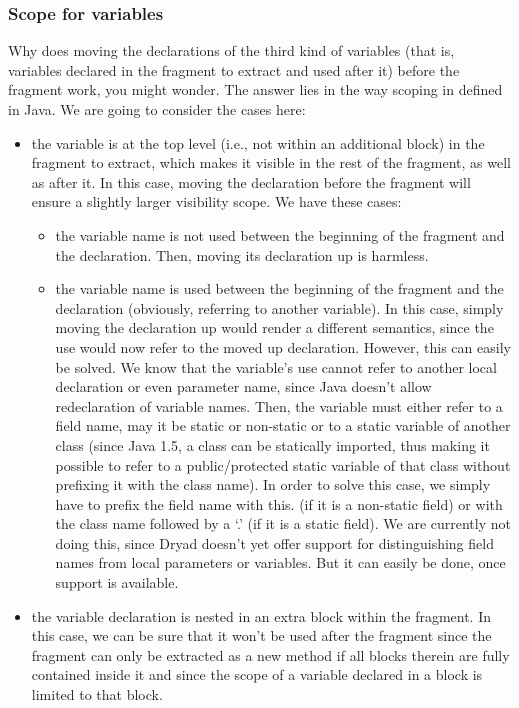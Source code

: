 \documentclass[a4paper,10pt]{article}
\begin{document}
\subsubsection*{Scope for variables}

Why does moving the declarations of the third kind of variables
(that is, variables declared in the fragment to extract and used after it)
before the fragment work, you might wonder. The answer lies in the
way scoping in defined in Java. We are going to consider the cases here:

\begin{itemize}

\item the variable is at the top level (i.e., not within an additional
block) in the fragment to extract, which makes it visible in the
rest of the fragment, as well as after it. In this case, moving the
declaration before the fragment will ensure a slightly larger
visibility scope. We have these cases:

\begin{itemize}

\item the variable name is not used between the beginning of the
fragment and the declaration. Then, moving its declaration up
is harmless.

\item the variable name is used between the beginning of the
fragment and the declaration (obviously, referring to another
variable). In this case, simply moving the declaration up would
render a different semantics, since the use would now refer to
the moved up declaration. However, this can easily be solved.
We know that the variable's use cannot refer to another local
declaration or even parameter name, since Java doesn't allow
redeclaration of variable names. Then, the variable must either
refer to a field name, may it be static or non-static or to a static
variable of another class (since Java 1.5, a class can be
statically imported, thus making it possible to refer to a
public/protected static variable of that class without prefixing
it with the class name). In order to solve this case, we simply
have to prefix the field name with \textsf{this.} (if it is a
non-static field) or with the class name followed by a `.' (if
it is a static field). We are currently not doing this, since Dryad
doesn't yet offer support for distinguishing field names from
local parameters or variables. But it can easily be done, once
support is available.

\end{itemize}

\item the variable declaration is nested in an extra block within
the fragment. In this case, we can be sure that it won't be
used after the fragment since the fragment can only be
extracted as a new method if all blocks therein are fully contained
inside it and since the scope of a variable declared in a block
is limited to that block.

\end{itemize}
\end{document}
